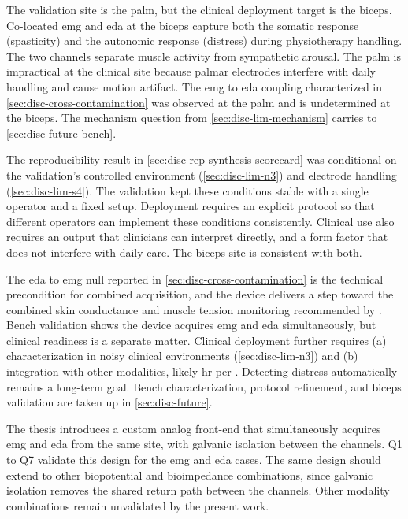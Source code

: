The validation site is the palm, but the clinical deployment target is the biceps. Co-located \gls{emg} and \gls{eda} at the biceps capture both the somatic response (spasticity) and the autonomic response (distress) during physiotherapy handling. The two channels separate muscle activity from sympathetic arousal. The palm is impractical at the clinical site because palmar electrodes interfere with daily handling and cause motion artifact. The \gls{emg} to \gls{eda} coupling characterized in \autoref{sec:disc-cross-contamination} was observed at the palm and is undetermined at the biceps. The mechanism question from \autoref{sec:disc-lim-mechanism} carries to \autoref{sec:disc-future-bench}.

The reproducibility result in \autoref{sec:disc-rep-synthesis-scorecard} was conditional on the validation's controlled environment (\autoref{sec:disc-lim-n3}) and electrode handling (\autoref{sec:disc-lim-s4}). The validation kept these conditions stable with a single operator and a fixed setup. Deployment requires an explicit protocol so that different operators can implement these conditions consistently. Clinical use also requires an output that clinicians can interpret directly, and a form factor that does not interfere with daily care. The biceps site is consistent with both.

The \gls{eda} to \gls{emg} null reported in \autoref{sec:disc-cross-contamination} is the technical precondition for combined acquisition, and the device delivers a step toward the combined skin conductance and muscle tension monitoring recommended by \textcite{bull_heart_2025}. Bench validation shows the device acquires \gls{emg} and \gls{eda} simultaneously, but clinical readiness is a separate matter. Clinical deployment further requires (a) characterization in noisy clinical environments (\autoref{sec:disc-lim-n3}) and (b) integration with other modalities, likely \gls{hr} per \textcite{kildal_increased_2021}. Detecting distress automatically remains a long-term goal. Bench characterization, protocol refinement, and biceps validation are taken up in \autoref{sec:disc-future}.

The thesis introduces a custom analog front-end that simultaneously acquires \gls{emg} and \gls{eda} from the same site, with galvanic isolation between the channels. Q1 to Q7 validate this design for the \gls{emg} and \gls{eda} cases. The same design should extend to other biopotential and bioimpedance combinations, since galvanic isolation removes the shared return path between the channels. Other modality combinations remain unvalidated by the present work.


